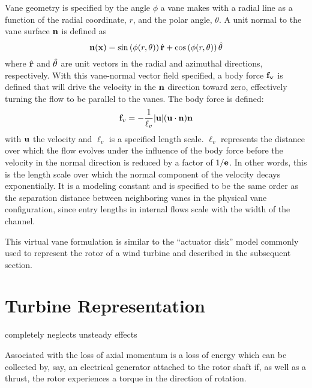 Vane geometry is specified by the angle $\phi$ a vane makes with a
radial line as a function of the radial coordinate, $r$, and the polar
angle, $\theta$. A unit normal to the vane surface ${\bf n}$ is defined
as 
%
\begin{equation}
 {\bf n}({\bf x}) = \sin \left(\phi(r,\theta) \right) \hat{{\bf r}}+ \cos
  \left(\phi(r,\theta) \right) \hat{{\bf \theta}} 
\end{equation}
%
where $\hat{{\bf r}}$ and $\hat{{\bf \theta}}$ are unit
vectors in the radial and azimuthal directions, respectively.
With this vane-normal vector field specified, a body force ${\bf f_v}$
is defined
that will drive the velocity in the ${\bf n}$ direction toward zero,
effectively turning the flow to be parallel to the vanes. The body
force is defined:
\begin{equation}
 {\bf f}_v= -\frac{1}{\ell_v}|{\bf u}|({\bf u}\cdot{\bf n}){\bf n}
 \label{eqn:body_force}
\end{equation}
with ${\bf u}$ the velocity and $\ell_v$ is a specified length
scale. $\ell_v$ represents the distance over which the
flow evolves under the influence of the body force before the
velocity in the normal direction is reduced by a factor of $1/{\bf
e}$.
In other words, this is the length scale over which the
normal component of the velocity decays exponentially.
It is a modeling constant and is specified to be
the same order as the separation distance between neighboring vanes in
the physical vane configuration, since entry lengths in internal flows
scale with the width of the channel.

This virtual vane formulation is similar to the ``actuator disk'' model
commonly used to represent the rotor of a wind turbine and
described in the subsequent section. 

\section{Turbine Representation}

%
%


completely neglects unsteady effects

Associated with the loss of axial momentum is a loss of energy which can
be collected by, say, an electrical generator attached to the rotor
shaft if, as well as a thrust, the rotor experiences a torque in the
direction of rotation. 

